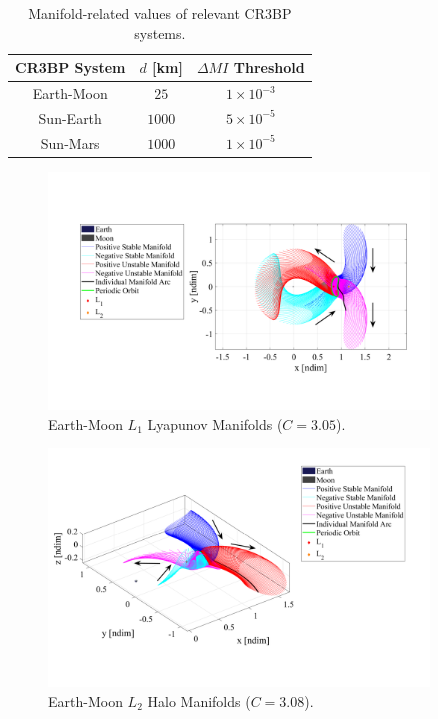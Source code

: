 \begin{table}[ht]
    \centering
    \caption{Manifold-related values of relevant CR3BP systems.}
    \begin{tabular}{|c|c|c|}
        \hline
        \textbf{CR3BP System}   &   \boldmath$d$ \textbf{[km]}  &   \boldmath$\Delta MI$ \textbf{Threshold} \\  \hline
        Earth-Moon              &   $25$                        &   $1\times10^{-3}$                        \\  \hline
        Sun-Earth               &   $1000$                      &   $5\times10^{-5}$                        \\  \hline
        Sun-Mars                &   $1000$                      &   $1\times10^{-5}$                        \\  \hline
    \end{tabular}
    \label{tab:manifoldValues}
\end{table}

\begin{figure}[ht]
    \centering
    \includegraphics[width=0.9\textwidth]{figures/LyapunovManifold.pdf}
    \caption{Earth-Moon $L_{1}$ Lyapunov Manifolds ($C=3.05$).}
    \label{fig:LyapunovManifold}
\end{figure}

\begin{figure}[ht]
    \centering
    \includegraphics[width=0.9\textwidth]{figures/HaloManifold.pdf}
    \caption{Earth-Moon $L_{2}$ Halo Manifolds ($C=3.08$).}
    \label{fig:haloManifold}
\end{figure}

